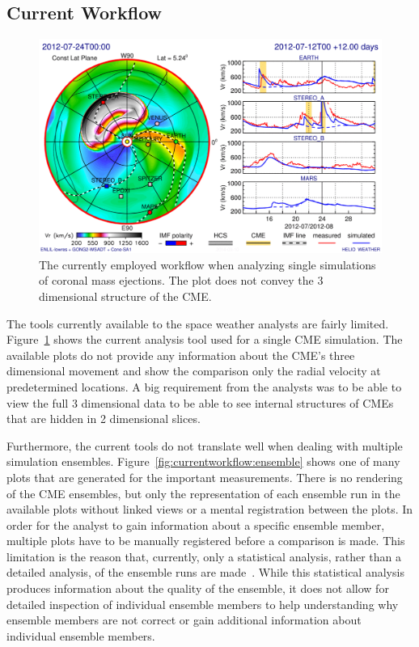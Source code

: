 \documentclass[journal]{vgtc}                %
\begin{document}
\subsection{Current Workflow} \label{sec:currentworkflow}
\begin{figure}
\newcommand{\abImageWidth}{\columnwidth}
\centering
\includegraphics[width=\abImageWidth]{figures/current_workflow.png}
\caption{The currently employed workflow when analyzing single simulations of coronal mass ejections. The plot does not convey the 3 dimensional structure of the CME.}
\label{fig:currentworkflow:single}
\end{figure}

The tools currently available to the space weather analysts are fairly limited. Figure~\ref{fig:currentworkflow:single} shows the current analysis tool used for a single CME simulation. The available plots do not provide any information about the CME's three dimensional movement and show the comparison only the radial velocity at predetermined locations. A big requirement from the analysts was to be able to view the full 3 dimensional data to be able to see internal structures of CMEs that are hidden in 2 dimensional slices.

Furthermore, the current tools do not translate well when dealing with multiple simulation ensembles. Figure~\ref{fig:currentworkflow:ensemble} shows one of many plots that are generated for the important measurements. There is no rendering of the CME ensembles, but only the representation of each ensemble run in the available plots without linked views or a mental registration between the plots. In order for the analyst to gain information about a specific ensemble member, multiple plots have to be manually registered before a comparison is made. This limitation is the reason that, currently, only a statistical analysis, rather than a detailed analysis, of the ensemble runs are made~\cite{mays2015ensemble}. While this statistical analysis produces information about the quality of the ensemble, it does not allow for detailed inspection of individual ensemble members to help understanding why ensemble members are not correct or gain additional information about individual ensemble members.
\end{document}
